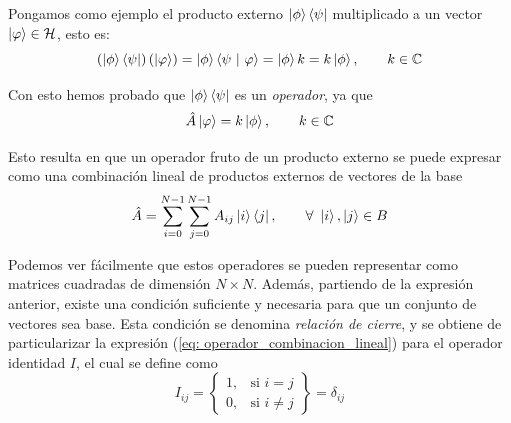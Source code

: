 \documentclass{article}
\numberwithin{equation}{section} %
\begin{document}
    \vspace{1.5mm}

    Pongamos como ejemplo el producto externo \( \ket{\phi} \bra{\psi} \) multiplicado a un vector \( \ket{\varphi} \in \mathcal{H} \), esto es:
    \begin{equation*}
        \left( \ket{\phi} \bra{\psi} \right) \left( \ket{\varphi} \right) = \ket{\phi} \braket{\psi \ | \ \varphi} = \ket{\phi} k = k \ket{\phi}, \qquad k \in \mathbb{C}
    \end{equation*}

    \vspace{1.5mm}

    Con esto hemos probado que \( \ket{\phi} \bra{\psi} \) es un \textit{operador}, ya que 
    \begin{equation}
        \hat{A} \ket\varphi = k \ket{\phi}, \qquad k \in \mathbb{C}
    \end{equation}

    \vspace{1.5mm}

    Esto resulta en que un operador fruto de un producto externo se puede expresar como una combinación lineal de productos externos de vectores de la base
    \begin{equation}
        \hat{A} = \sum_{i = 0}^{N - 1} \sum_{j = 0}^{N - 1} A_{ij} \ket{i} \bra{j}, \qquad \forall \ \ket{i}, \ket{j} \in B
        \label{eq: operador_combinacion_lineal}
    \end{equation}

    \vspace{1.5mm}

    Podemos ver fácilmente que estos operadores se pueden representar como matrices cuadradas de dimensión \( N \times N \). Además, partiendo de la expresión anterior, existe una condición suficiente y necesaria para que un conjunto de vectores sea base. Esta condición se denomina \textit{relación de cierre}, y se obtiene de particularizar la expresión (\ref{eq: operador_combinacion_lineal}) para el operador identidad \( I \), el cual se define como 
    \begin{equation}
        I_{ij} =
        \left\{
        \begin{array}{ll}
            1, & \text{si } i = j \\
            0, & \text{si } i \neq j
        \end{array}
        \right\}
        = \delta_{ij}
    \end{equation}
\end{document}
